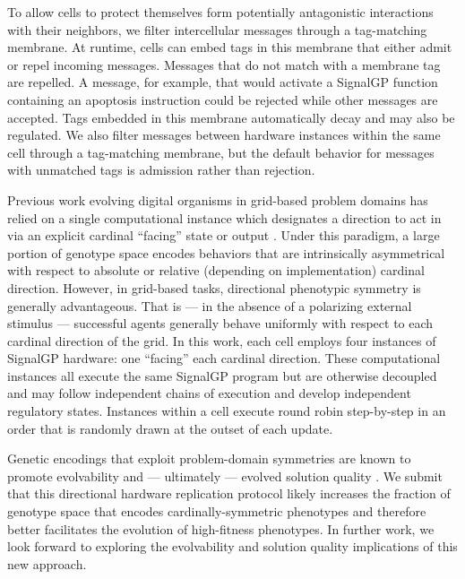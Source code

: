 To allow cells to protect themselves form potentially antagonistic interactions with their neighbors, we filter intercellular messages through a tag-matching membrane.
At runtime, cells can embed tags in this membrane that either admit or repel incoming messages.
Messages that do not match with a membrane tag are repelled.
A message, for example, that would activate a SignalGP function containing an apoptosis instruction could be rejected while other messages are accepted.
Tags embedded in this membrane automatically decay and may also be regulated.
We also filter messages between hardware instances within the same cell through a tag-matching membrane, but the default behavior for messages with unmatched tags is admission rather than rejection.

Previous work evolving digital organisms in grid-based problem domains has relied on a single computational instance which designates a direction to act in via an explicit cardinal ``facing'' state or output \cite{goldsby2014evolutionary, goldsby2018serendipitous, grabowski2010early, biswas2014causes, lalejini2018evolving}.
Under this paradigm, a large portion of genotype space encodes behaviors that are intrinsically asymmetrical with respect to absolute or relative (depending on implementation) cardinal direction.
However, in grid-based tasks, directional phenotypic symmetry is generally advantageous.
That is --- in the absence of a polarizing external stimulus --- successful agents generally behave uniformly with respect to each cardinal direction of the grid.
In this work, each cell employs four instances of SignalGP hardware: one ``facing'' each cardinal direction.
These computational instances all execute the same SignalGP program but are otherwise decoupled and may follow independent chains of execution and develop independent regulatory states.
Instances within a cell execute round robin step-by-step in an order that is randomly drawn at the outset of each update.

Genetic encodings that exploit problem-domain symmetries are known to promote evolvability and --- ultimately --- evolved solution quality \cite{clune2011performance, cheney2014unshackling}.
We submit that this directional hardware replication protocol likely increases the fraction of genotype space that encodes cardinally-symmetric phenotypes and therefore better facilitates the evolution of high-fitness phenotypes.
In further work, we look forward to exploring the evolvability and solution quality implications of this new approach.

